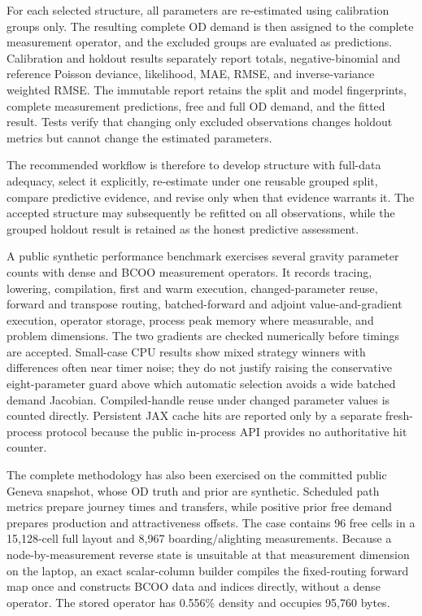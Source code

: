 For each selected structure, all parameters are re-estimated using calibration
groups only.  The resulting complete OD demand is then assigned to the complete
measurement operator, and the excluded groups are evaluated as predictions.
Calibration and holdout results separately report totals, negative-binomial and
reference Poisson deviance, likelihood, MAE, RMSE, and inverse-variance weighted
RMSE.  The immutable report retains the split and model fingerprints, complete
measurement predictions, free and full OD demand, and the fitted result.  Tests
verify that changing only excluded observations changes holdout metrics but cannot
change the estimated parameters.

The recommended workflow is therefore to develop structure with full-data
adequacy, select it explicitly, re-estimate under one reusable grouped split,
compare predictive evidence, and revise only when that evidence warrants it.
The accepted structure may subsequently be refitted on all observations, while
the grouped holdout result is retained as the honest predictive assessment.

A public synthetic performance benchmark exercises several gravity parameter
counts with dense and BCOO measurement operators.  It records tracing, lowering,
compilation, first and warm execution, changed-parameter reuse, forward and
transpose routing, batched-forward and adjoint value-and-gradient execution,
operator storage, process peak memory where measurable, and problem dimensions.
The two gradients are checked numerically before timings are accepted.  Small-case
CPU results show mixed strategy winners with differences often near timer noise;
they do not justify raising the conservative eight-parameter guard above which
automatic selection avoids a wide batched demand Jacobian.  Compiled-handle reuse
under changed parameter values is counted directly.  Persistent JAX cache hits are
reported only by a separate fresh-process protocol because the public in-process
API provides no authoritative hit counter.

The complete methodology has also been exercised on the committed public Geneva
snapshot, whose OD truth and prior are synthetic.  Scheduled path metrics prepare
journey times and transfers, while positive prior free demand prepares production
and attractiveness offsets.  The case contains 96 free cells in a 15,128-cell
full layout and 8,967 boarding/alighting measurements.  Because a
node-by-measurement reverse state is unsuitable at that measurement dimension on
the laptop, an exact scalar-column builder compiles the fixed-routing forward map
once and constructs BCOO data and indices directly, without a dense operator.  The
stored operator has 0.556\% density and occupies 95,760 bytes.

